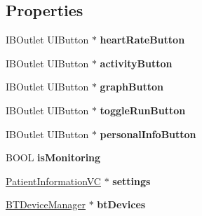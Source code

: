 \subsection*{Properties}
\begin{DoxyCompactItemize}
\item 
\hypertarget{interface_home_screen_v_c_af710ad88b755f5ac91d32478a385af6f}{I\-B\-Outlet U\-I\-Button $\ast$ {\bfseries heart\-Rate\-Button}}\label{interface_home_screen_v_c_af710ad88b755f5ac91d32478a385af6f}

\item 
\hypertarget{interface_home_screen_v_c_aaf7bc9fa4c07923d2df10b9dc6977c02}{I\-B\-Outlet U\-I\-Button $\ast$ {\bfseries activity\-Button}}\label{interface_home_screen_v_c_aaf7bc9fa4c07923d2df10b9dc6977c02}

\item 
\hypertarget{interface_home_screen_v_c_a1e29323a37c594f0e641d1f660605721}{I\-B\-Outlet U\-I\-Button $\ast$ {\bfseries graph\-Button}}\label{interface_home_screen_v_c_a1e29323a37c594f0e641d1f660605721}

\item 
\hypertarget{interface_home_screen_v_c_aad6f8311d7f241d28c255af76fea1c4b}{I\-B\-Outlet U\-I\-Button $\ast$ {\bfseries toggle\-Run\-Button}}\label{interface_home_screen_v_c_aad6f8311d7f241d28c255af76fea1c4b}

\item 
\hypertarget{interface_home_screen_v_c_a8324fe604c4a1dae3d45f9b6fb63d80f}{I\-B\-Outlet U\-I\-Button $\ast$ {\bfseries personal\-Info\-Button}}\label{interface_home_screen_v_c_a8324fe604c4a1dae3d45f9b6fb63d80f}

\item 
\hypertarget{interface_home_screen_v_c_afa80d36d3ba21b19c0aea885cc76f811}{B\-O\-O\-L {\bfseries is\-Monitoring}}\label{interface_home_screen_v_c_afa80d36d3ba21b19c0aea885cc76f811}

\item 
\hypertarget{interface_home_screen_v_c_a89f03faa7fe6fba12a8d17dead120a0c}{\hyperlink{interface_patient_information_v_c}{Patient\-Information\-V\-C} $\ast$ {\bfseries settings}}\label{interface_home_screen_v_c_a89f03faa7fe6fba12a8d17dead120a0c}

\item 
\hypertarget{interface_home_screen_v_c_a2d29b010a455bf37937421fac3bfde81}{\hyperlink{interface_b_t_device_manager}{B\-T\-Device\-Manager} $\ast$ {\bfseries bt\-Devices}}\label{interface_home_screen_v_c_a2d29b010a455bf37937421fac3bfde81}


\end{DoxyCompactItemize}
